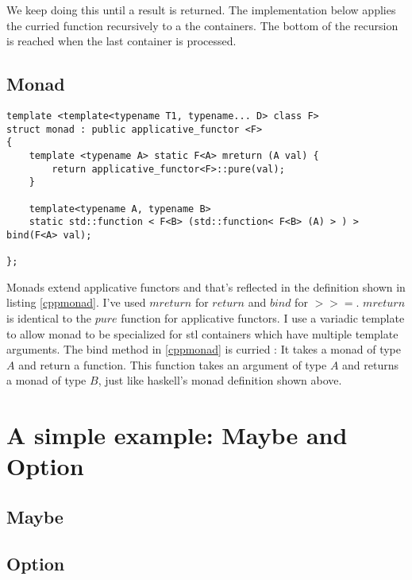 \documentclass[12pt,fleqn]{article}
\begin{document}
We keep doing this until a result is returned.
The implementation below applies the curried function recursively to a the containers. 
The bottom of the recursion is reached when the last container is processed.


%
%
%
\subsection{Monad}
%
%
%

\begin{lstlisting}[caption=monad defintion in C++, label=cppmonad]
template <template<typename T1, typename... D> class F> 
struct monad : public applicative_functor <F>
{
	template <typename A> static F<A> mreturn (A val) {
		return applicative_functor<F>::pure(val);
	}

	template<typename A, typename B>
	static std::function < F<B> (std::function< F<B> (A) > ) > bind(F<A> val);
	
};
\end{lstlisting}

Monads extend applicative functors and that's reflected in the definition shown in listing \ref{cppmonad}.
I've used $mreturn$ for $return$ and $bind$ for $>>=$.
$mreturn$ is identical to the $pure$ function for applicative functors.
I use a variadic template to allow monad to be specialized for stl containers which have multiple template arguments. 
The bind method in \ref{cppmonad} is curried : It takes a monad of type $A$ and return a function.
This function takes an argument of type $A$ and returns a monad of type $B$, just like haskell's monad definition shown above.

%
%
\section{A simple example: Maybe and Option}
%
%
%
\subsection{Maybe}




\subsection{Option}
\end{document}
